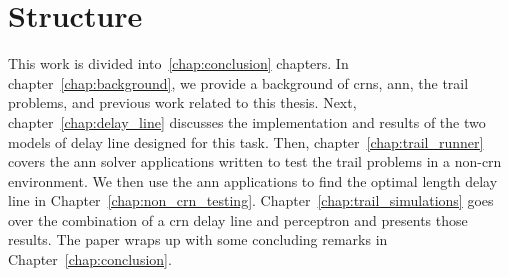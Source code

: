 \section{Structure}
This work is divided into~\ref*{chap:conclusion} chapters. In chapter~\ref{chap:background}, we provide a background of \glspl{crn}, \gls{ann}, the trail problems, and previous work related to this thesis. Next, chapter~\ref{chap:delay_line} discusses the implementation and results of the two models of delay line designed for this task. Then, chapter~\ref{chap:trail_runner} covers the \gls{ann} solver applications written to test the trail problems in a non-\gls{crn} environment. We then use the \gls{ann} applications to find the optimal length delay line in Chapter~\ref{chap:non_crn_testing}. Chapter~\ref{chap:trail_simulations} goes over the combination of a \gls{crn} delay line and perceptron and presents those results. The paper wraps up with some concluding remarks in Chapter~\ref{chap:conclusion}.
